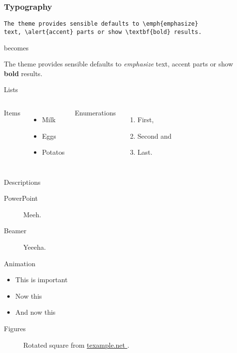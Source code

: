\documentclass[10pt, compress]{beamer}
\newcommand{\ehref}[2]{\href{#1}{#2 \hspace{-.2em}{\scriptsize\faExternalLink}}}
\begin{document}
\begin{frame}[fragile]
  \frametitle{Typography}
      \begin{verbatim}
The theme provides sensible defaults to \emph{emphasize}
text, \alert{accent} parts or show \textbf{bold} results.
      \end{verbatim}

  \begin{center}becomes\end{center}

  The theme provides sensible defaults to \emph{emphasize} text,
  \alert{accent} parts or show \textbf{bold} results.
\end{frame}
\begin{frame}{Lists}
  \begin{columns}[onlytextwidth]
      Items
      \begin{itemize}
        \item Milk \item Eggs \item Potatos
      \end{itemize}

      Enumerations
      \begin{enumerate}
        \item First, \item Second and \item Last.
      \end{enumerate}
  \end{columns}
\end{frame}
\begin{frame}{Descriptions}
  \begin{description}
    \item[PowerPoint] Meeh.
    \item[Beamer] Yeeeha.
  \end{description}
\end{frame}
\begin{frame}{Animation}
  \begin{itemize}[<+- | alert@+>]
    \item \alert<4>{This is important}
    \item Now this
    \item And now this
  \end{itemize}
\end{frame}
\begin{frame}{Figures}
  \begin{figure}
    \setcounter{density}{20}
    
    \caption{Rotated square from
    \ehref{http://www.texample.net/tikz/examples/rotated-polygons/}{texample.net}.}
  \end{figure}
\end{frame}
\end{document}
